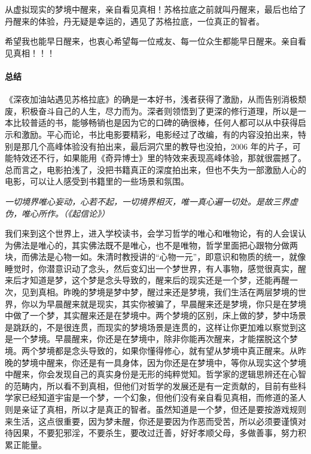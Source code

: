 从虚拟现实的梦境中醒来，亲自看见真相！苏格拉底之前就叫丹醒来，最后也给了丹醒来的体验，丹无疑是幸运的，遇见了苏格拉底，一位真正的智者。

希望我也能早日醒来，也衷心希望每一位戒友、每一位众生都能早日醒来。亲自看见真相！！！

\paragraph{总结}

《深夜加油站遇见苏格拉底》的确是一本好书，浅者获得了激励，从而告别消极颓废，积极奋斗自己的人生，尽力而为。深者则领悟到了更深的修行道理，所以是一本比较普适的书，能够畅销也是因为它的口碑的确很棒，任何人都可以从中获得启示和激励。平心而论，书比电影要精彩，电影经过了改编，有的内容没拍出来，特别是那几个高峰体验没有拍出来，最后洞穴里的教导也没拍，2006 年的片子，可能特效还不行，如果能用《奇异博士》里的特效来表现高峰体验，那就很震撼了。总而言之，电影拍浅了，没把书籍真正的深度拍出来，但也不失为一部激励人心的电影，可以让人感受到书籍里的一些场景和氛围。

\textit{一切境界唯心妄动，心若不起，一切境界相灭，唯一真心遍一切处。是故三界虚伪，唯心所作。（《起信论》）}

我们来到这个世界上，进入学校读书，会学习哲学的唯心和唯物论，有的人会误认为佛法是唯心的，其实佛法既不是唯心，也不是唯物，哲学里面把心跟物分做两块，而佛法是心物一如。朱清时教授讲的“心物一元”，即意识和物质的统一，就像睡觉时，你潜意识动了念头，然后变幻出一个梦世界，有人事物，感觉很真实，醒来后才知道是梦，这个梦是念头导致的，醒来后的现实还是一个梦，还能再醒一次，见到真相。昨晚的梦境是梦中梦，醒过来还是梦境，我们生活在两层梦境的世界，你以为早晨醒来就是现实，其实你被骗了，早晨醒来还是梦境，你只是在梦境中做了一个梦，其实醒来还是在梦境中。两个梦境的区别，床上做的梦，梦中场景是跳跃的，不是很连贯，而现实的梦境场景是连贯的，这样让你更加难以察觉到这是一个梦境。早晨醒来，你还是在梦境中，除非你能再次醒来，才能摆脱这个梦境。两个梦境都是念头导致的，如果你懂得修心，就有望从梦境中真正醒来。从昨晚的梦境中醒来，你还是有一具身体，因为你还是在梦境中，等你从现实这个梦境中醒来，你会发现自己的真实身份是无形的纯粹觉知。哲学家的逻辑思辨还在心智的范畴内，所以看不到真相，但他们对哲学的发展还是有一定贡献的，目前有些科学家已经知道宇宙是一个梦，一个幻象，但他们没有亲自看见真相，而修道的圣人则是亲证了真相，所以才是真正的智者。虽然知道是一个梦，但还是要按游戏规则来生活，这点很重要，因为梦未醒，你还是要因为作恶而受苦，所以必须要谨慎对待因果，不要犯邪淫，不要杀生，要改过迁善，好好孝顺父母，多做善事，努力积累正能量。

